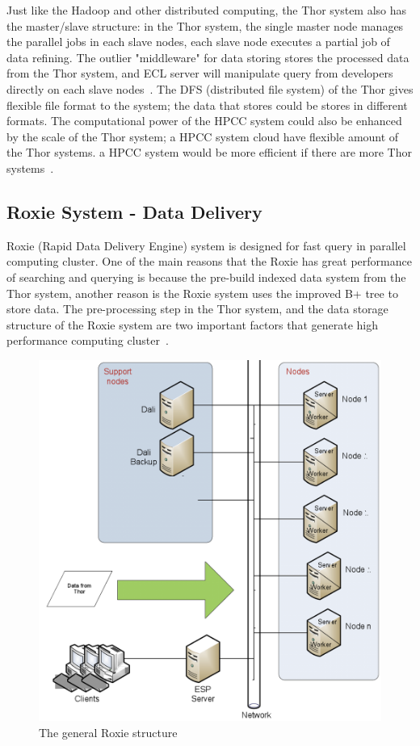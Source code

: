 Just like the Hadoop and other distributed computing, the Thor system also has the master/slave structure: in the Thor system, the single master node manages the parallel jobs in each slave nodes, each slave node executes a partial job of data refining. The outlier "middleware" for data storing stores the processed data from the Thor system, and ECL server will manipulate query from developers directly on each slave nodes~\cite{Intro4}. The DFS (distributed file system) of the Thor gives flexible file format to the system; the data that stores could be stores in different formats. The computational power of the HPCC system could also be enhanced by the scale of the Thor system; a HPCC system cloud have flexible amount of the Thor systems. a HPCC system would be more efficient if there are more Thor systems~\cite{Intro4}.

\subsection{Roxie System - Data Delivery}
Roxie (Rapid Data Delivery Engine) system is designed for fast query in parallel computing cluster. One of the main reasons that the Roxie has great performance of searching and querying is because the pre-build indexed data system from the Thor system, another reason is the Roxie system uses the improved B+ tree to store data. The pre-processing step in the Thor system, and the data storage structure of the Roxie system are two important factors that generate high performance computing cluster~\cite{Intro4}.  

\begin{figure}[!ht]
\centering\includegraphics[width=\columnwidth]{images/roxie.png}
\caption{The general Roxie structure}\label{f:roxie}
\end{figure}

